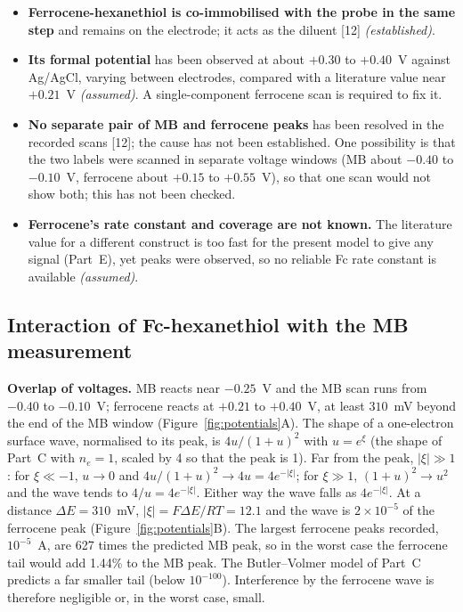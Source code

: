 \documentclass[10pt,a4paper]{article}
\numberwithin{equation}{section}
\newcommand{\cit}[1]{[#1]}
\newcommand{\FLAG}{\textit{(assumed)}}
\newcommand{\CONF}{\textit{(established)}}
\newcommand{\figref}[1]{Figure~\ref{#1}}
\newenvironment{assump}{\small}{\smallskip}
\newcommand{\fcMbRatio}{627}
\newcommand{\gapFc}{310}
\newcommand{\leakEnv}{\ensuremath{2\times10^{-5}}}
\newcommand{\leakMB}{1.44}
\begin{document}
\begin{assump}
\begin{itemize}[leftmargin=*]
\item \textbf{Ferrocene-hexanethiol is co-immobilised with the probe in the same step} and
  remains on the electrode; it acts as the diluent \cit{12} \CONF.
\item \textbf{Its formal potential} has been observed at about $+0.30$ to $+0.40$~V
  against Ag/AgCl, varying between electrodes, compared with a literature value near $+0.21$~V \FLAG. A single-component ferrocene scan is required to fix it.
\item \textbf{No separate pair of MB and ferrocene peaks} has been resolved in the recorded
  scans \cit{12}; the cause has not been established. One possibility is that the two labels were scanned in
  separate voltage windows (MB about $-0.40$ to $-0.10$~V, ferrocene about $+0.15$ to $+0.55$~V),
  so that one scan would not show both; this has not been checked.
\item \textbf{Ferrocene's rate constant and coverage are not known.} The literature value for a
  different construct is too fast for the present model to give any signal (Part~E), yet peaks were
  observed, so no reliable Fc rate constant is available \FLAG.
\end{itemize}
\end{assump}

\subsection{Interaction of Fc-hexanethiol with the MB measurement}

\textbf{Overlap of voltages.} MB reacts near $-0.25$~V and the MB scan runs from $-0.40$ to
$-0.10$~V; ferrocene reacts at $+0.21$ to $+0.40$~V, at least $\gapFc$~mV beyond the end of the MB
window (\figref{fig:potentials}A). The shape of a one-electron surface wave, normalised to its peak, is $4u/(1+u)^2$ with $u=e^{\xi}$ (the shape
of Part~C with $n_e=1$, scaled by 4 so that the peak is 1). Far from the peak, $|\xi|\gg1$: for $\xi\ll-1$, $u\to0$ and $4u/(1+u)^2\to4u=4e^{-|\xi|}$; for $\xi\gg1$,
$(1+u)^2\to u^2$ and the wave tends to $4/u=4e^{-|\xi|}$. Either way the wave falls as $4e^{-|\xi|}$. At a distance $\Delta E=\gapFc$~mV, $|\xi|=F\Delta E/RT=12.1$ and the wave is
$\leakEnv$ of the ferrocene peak
(\figref{fig:potentials}B). The largest ferrocene peaks recorded, $10^{-5}$~A, are \fcMbRatio{} times the predicted MB peak, so in the
worst case the ferrocene tail would add \leakMB\% to the MB peak. The Butler--Volmer model of Part~C
predicts a far smaller tail (below $10^{-100}$). Interference by the ferrocene wave is therefore
negligible or, in the worst case, small.
\end{document}
